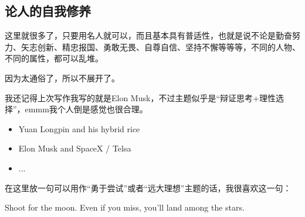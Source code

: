 \subsection{论人的自我修养}
这里就很多了，只要用名人就可以，而且基本具有普适性，也就是说不论是勤奋努力、矢志创新、精忠报国、勇敢无畏、自尊自信、坚持不懈等等等，不同的人物、不同的属性，都可以乱堆。
\par
因为太通俗了，所以不展开了。
\par
我还记得上次写作我写的就是Elon Musk，不过主题似乎是“辩证思考+理性选择”，emmm我个人倒是感觉也很合理。
\begin{itemize}
    \item Yuan Longpin and his hybrid rice
    \item Elon Musk and SpaceX / Telsa
    \item ...
\end{itemize}
\par 
在这里放一句可以用作“勇于尝试”或者“远大理想”主题的话，我很喜欢这一句：
\par
Shoot for the moon. Even if you miss, you'll land among the stars.
